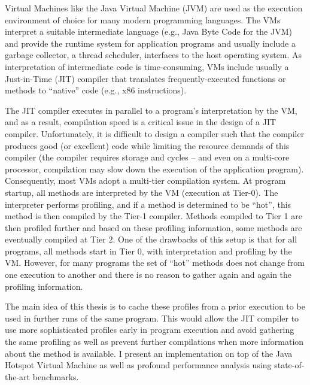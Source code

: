 Virtual Machines like the Java Virtual Machine (JVM) are used as the execution environment of choice for many modern programming languages. 
The VMs interpret a suitable intermediate language (e.g., Java Byte Code for the JVM) and provide the runtime system for application programs and usually include a garbage collector, a thread scheduler, interfaces to the host operating system. 
As interpretation of intermediate code is time-consuming, VMs include usually a Just-in-Time (JIT) compiler that translates frequently-executed functions or methods to “native” code (e.g., x86 instructions).

The JIT compiler executes in parallel to a program’s interpretation by the VM, and as a result, compilation speed is a critical issue in the design of a JIT compiler.
Unfortunately, it is difficult to design a compiler such that the compiler produces good (or excellent) code while limiting the resource demands of this compiler (the compiler requires storage and cycles – and even on a multi-core processor, compilation may slow down the execution of the application program). 
Consequently, most VMs adopt a multi-tier compilation system.
At program startup, all methods are interpreted by the VM (execution at Tier-0). The interpreter performs profiling, and if a method is determined to be “hot”, this method is then compiled by the Tier-1 compiler. Methods compiled to Tier 1 are then profiled further and based on these profiling information, some methods are eventually compiled at Tier 2.
One of the drawbacks of this setup is that for all programs, all methods start in Tier 0, with interpretation and profiling by the VM. However, for many programs the set of “hot” methods does not change from one execution to another and there is no reason to gather again and again the profiling information. 

The main idea of this thesis is to cache these profiles from a prior execution to be used in further runs of the same program. 
This would allow the JIT compiler to use more sophisticated profiles early in program execution and avoid gathering the same profiling as well as prevent further compilations when more information about the method is available.
I present an implementation on top of the Java Hotspot Virtual Machine as well as profound performance analysis using state-of-the-art benchmarks.
